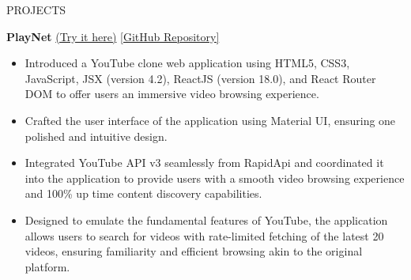 \documentclass{resume} %
\begin{document}
\begin{rSection}{PROJECTS}
    \item \textbf{PlayNet} {\href{https://play-net-eight.vercel.app/}{(Try it here)}}
    {\href{https://github.com/arkapg211002/PlayNet}{[GitHub Repository]}}
    \vspace{-0.6em}
    \begin{itemize}
    \setlength\itemsep{-0.6em}
     \item Introduced  a  YouTube  clone  web  application  using  HTML5,  CSS3,  JavaScript,  JSX  (version  4.2),  ReactJS (version 18.0), and React Router DOM to offer users an immersive video browsing experience.
    \item Crafted the user interface of the application using Material UI, ensuring one polished and intuitive design.
    \item Integrated  YouTube  API  v3  seamlessly from RapidApi and coordinated it into  the  application  to  provide  users  with  a  smooth  video  browsing experience and 100\% up time content discovery capabilities.
    \item Designed  to  emulate  the  fundamental  features  of  YouTube,  the  application  allows  users  to  search  for  videos with rate-limited fetching of the latest 20 videos, ensuring familiarity and efficient browsing akin to the original platform.
    \end{itemize}

\end{rSection}
\end{document}
